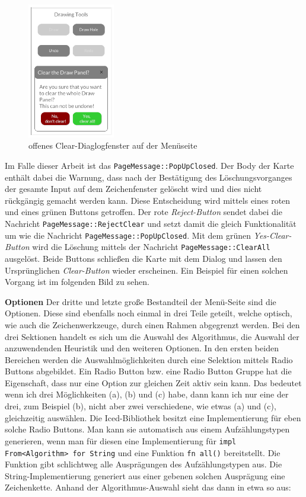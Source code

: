 \begin{figure}
    \includegraphics[width=0.34\textwidth]{bilder/clear_dialog.png}
    \caption[Clear-Dialogfenster]{offenes Clear-Diaglogfenster auf der Menüseite}
\end{figure}
Im Falle dieser Arbeit ist das \lstinline{PageMessage::PopUpClosed}. Der Body der Karte enthält dabei die Warnung, dass nach der Bestätigung des Löschungsvorganges der gesamte Input auf dem Zeichenfenster gelöscht wird und dies nicht rückgängig gemacht werden kann.
Diese Entscheidung wird mittels eines roten und eines grünen Buttons getroffen. Der rote \emph{Reject-Button} sendet dabei die Nachricht \lstinline{PageMessage::RejectClear} und setzt damit die gleich Funktionalität um wie die Nachricht \lstinline{PageMessage::PopUpClosed}.
Mit dem grünen \emph{Yes-Clear-Button} wird die Löschung mittels der Nachricht \lstinline{PageMessage::ClearAll} ausgelöst. Beide Buttons schließen die Karte mit dem Dialog und lassen den Ursprünglichen \emph{Clear-Button} wieder erscheinen. 
Ein Beispiel für einen solchen Vorgang ist im folgenden Bild zu sehen.\linebreak 

\textbf{\large{Optionen}}\linebreak
Der dritte und letzte große Bestandteil der Menü-Seite sind die Optionen. Diese sind ebenfalls noch einmal in drei Teile geteilt, welche optisch, wie auch die Zeichenwerkzeuge, durch einen Rahmen 
abgegrenzt werden. Bei den drei Sektionen handelt es sich um die Auswahl des Algorithmus, die Auswahl der anzuwendenden Heuristik und den weiteren Optionen.
In den ersten beiden Bereichen werden die Auswahlmöglichkeiten durch eine Selektion mittels Radio Buttons abgebildet. Ein Radio Button bzw. eine Radio Button Gruppe hat die Eigenschaft, dass nur eine Option zur gleichen Zeit aktiv sein kann.
Das bedeutet wenn ich drei Möglichkeiten (a), (b) und (c) habe, dann kann ich nur eine der drei, zum Beispiel (b), nicht aber zwei verschiedene, wie etwas (a) und (c), gleichzeitig auswählen.
Die Iced-Bibliothek besitzt eine Implementierung für eben solche Radio Buttons. Man kann sie automatisch aus einem Aufzählungstypen generieren, wenn man für diesen eine Implementierung für \lstinline{impl From<Algorithm> for String} und eine Funktion 
\lstinline{fn all()} bereitstellt. Die Funktion gibt schlichtweg alle Ausprägungen des Aufzählungstypen aus. Die String-Implementierung generiert aus einer gebenen solchen Ausprägung eine Zeichenkette.
Anhand der Algorithmus-Auswahl sieht das dann in etwa so aus:

